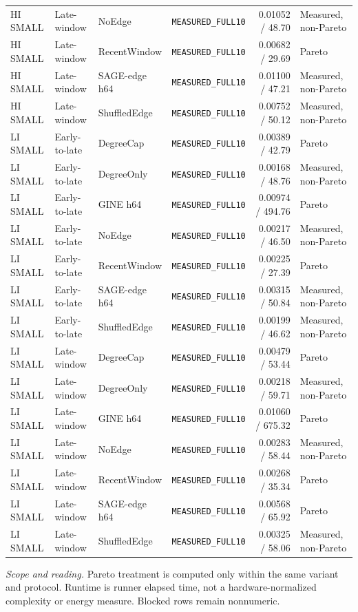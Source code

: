 \begin{longtable}{@{}p{} p{} p{} p{} r p{}@{}}
HI SMALL & Late-window & NoEdge & \texttt{MEASURED\_\allowbreak{}FULL10} & 0.01052 / 48.70 & Measured, non-Pareto \\
HI SMALL & Late-window & RecentWindow & \texttt{MEASURED\_\allowbreak{}FULL10} & 0.00682 / 29.69 & Pareto \\
HI SMALL & Late-window & SAGE-edge h64 & \texttt{MEASURED\_\allowbreak{}FULL10} & 0.01100 / 47.21 & Measured, non-Pareto \\
HI SMALL & Late-window & ShuffledEdge & \texttt{MEASURED\_\allowbreak{}FULL10} & 0.00752 / 50.12 & Measured, non-Pareto \\
LI SMALL & Early-to-late & DegreeCap & \texttt{MEASURED\_\allowbreak{}FULL10} & 0.00389 / 42.79 & Pareto \\
LI SMALL & Early-to-late & DegreeOnly & \texttt{MEASURED\_\allowbreak{}FULL10} & 0.00168 / 48.76 & Measured, non-Pareto \\
LI SMALL & Early-to-late & GINE h64 & \texttt{MEASURED\_\allowbreak{}FULL10} & 0.00974 / 494.76 & Pareto \\
LI SMALL & Early-to-late & NoEdge & \texttt{MEASURED\_\allowbreak{}FULL10} & 0.00217 / 46.50 & Measured, non-Pareto \\
LI SMALL & Early-to-late & RecentWindow & \texttt{MEASURED\_\allowbreak{}FULL10} & 0.00225 / 27.39 & Pareto \\
LI SMALL & Early-to-late & SAGE-edge h64 & \texttt{MEASURED\_\allowbreak{}FULL10} & 0.00315 / 50.84 & Measured, non-Pareto \\
LI SMALL & Early-to-late & ShuffledEdge & \texttt{MEASURED\_\allowbreak{}FULL10} & 0.00199 / 46.62 & Measured, non-Pareto \\
LI SMALL & Late-window & DegreeCap & \texttt{MEASURED\_\allowbreak{}FULL10} & 0.00479 / 53.44 & Pareto \\
LI SMALL & Late-window & DegreeOnly & \texttt{MEASURED\_\allowbreak{}FULL10} & 0.00218 / 59.71 & Measured, non-Pareto \\
LI SMALL & Late-window & GINE h64 & \texttt{MEASURED\_\allowbreak{}FULL10} & 0.01060 / 675.32 & Pareto \\
LI SMALL & Late-window & NoEdge & \texttt{MEASURED\_\allowbreak{}FULL10} & 0.00283 / 58.44 & Measured, non-Pareto \\
LI SMALL & Late-window & RecentWindow & \texttt{MEASURED\_\allowbreak{}FULL10} & 0.00268 / 35.34 & Pareto \\
LI SMALL & Late-window & SAGE-edge h64 & \texttt{MEASURED\_\allowbreak{}FULL10} & 0.00568 / 65.92 & Pareto \\
LI SMALL & Late-window & ShuffledEdge & \texttt{MEASURED\_\allowbreak{}FULL10} & 0.00325 / 58.06 & Measured, non-Pareto \\
\end{longtable}
\noindent\footnotesize\emph{Scope and reading.} Pareto treatment is computed only within the same variant and protocol. Runtime is runner elapsed time, not a hardware-normalized complexity or energy measure. Blocked rows remain nonnumeric.\par
\endgroup
